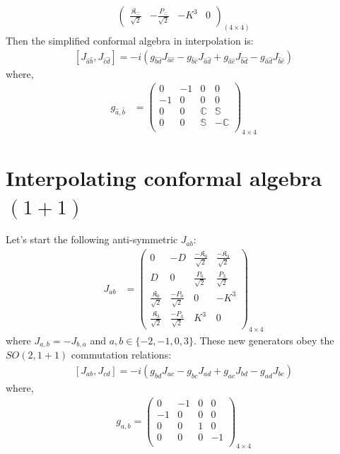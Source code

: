 \documentclass[]{article}
\numberwithin{equation}{section}
\begin{document}
{{\begin{align}
\begin{pmatrix}
    \frac{\mathfrak{K}_{\hat{-}}}{\sqrt{2}}&-\frac{P_{\hat{-}}}{\sqrt{2}}&-{K}^{3}  & 0
  \end{pmatrix}_{(4\times4)}
\end{align}
Then the simplified conformal algebra in interpolation is:
  \begin{align}
      \left[J_{{\hat{a}}{\hat{b}}},J_{{\hat{c}}{\hat{d}}}\right]=-i\left(g_{{\hat{b}}{\hat{d}}}J_{{\hat{a}}{\hat{c}}}-g_{{\hat{b}}{\hat{c}}}J_{{\hat{a}}{\hat{d}}}+g_{{\hat{a}}{\hat{c}}}J_{{\hat{b}}{\hat{d}}}-g_{{\hat{a}}{\hat{d}}}J_{{\hat{b}}{\hat{c}}}\right)\label{simplesrint}
  \end{align}
where, 
\begin{align}
    g_{\hat{a},\hat{b}}&=\begin{pmatrix}
  0&-1&0&0\\
  -1&0&0&0\\
  0&0&\mathbb{C}&\mathbb{S}\\
  0&0&\mathbb{S}&-\mathbb{C}\\
  \end{pmatrix}_{4\times4}
\end{align}

\section{Interpolating conformal algebra $(1+1)$}
Let's start the following anti-symmetric $J_{ab}$:
\begin{align}
  J_{ab}&=
  \begin{pmatrix}
  0&-D&\frac{-\mathfrak{K}_0}{\sqrt{2}}&\frac{-\mathfrak{K}_3}{\sqrt{2}}\\
  D&0&\frac{P_0}{\sqrt{2}}&\frac{P_3}{\sqrt{2}}\\
    \frac{\mathfrak{K}_0}{\sqrt{2}}&\frac{-P_0}{\sqrt{2}}&0  & -K^{3}\\
    \frac{\mathfrak{K}_3}{\sqrt{2}}&\frac{-P_3}{\sqrt{2}}&K^{3} & 0
  \end{pmatrix}_{4\times4}
\end{align}
where $J_{a,b}=-J_{b,a}$ and $a,b\in\{-2,-1,0,3\}$. These new generators obey the $SO(2,1+1)$ commutation relations:
  \begin{align}\label{algebrasimp}
      \left[J_{{a}{b}},J_{{c}{d}}\right]=-i\left(g_{{b}{d}}J_{{a}{c}}-g_{{b}{c}}J_{{a}{d}}+g_{{a}{c}}J_{{b}{d}}-g_{{a}{d}}J_{{b}{c}}\right)
  \end{align}
where, 
  \begin{align}\label{metric}
      g_{a,b}=\begin{pmatrix}
  0&-1&0&0\\
  -1&0&0&0\\
  0&0&1&0\\
  0&0&0&-1\\
  \end{pmatrix}_{4\times4}
  \end{align}
  
}}
\end{document}

